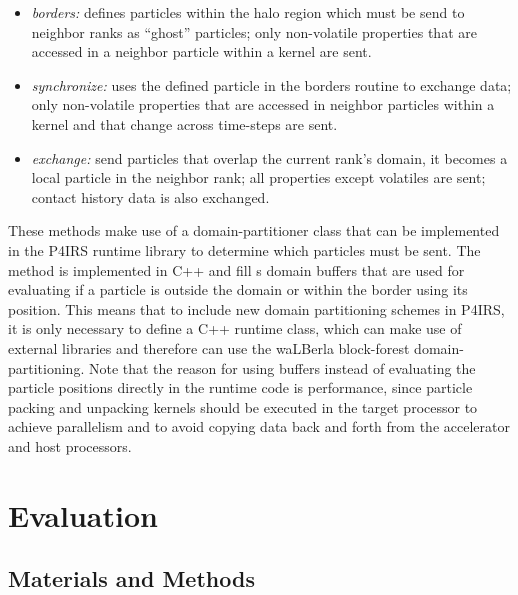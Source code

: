 \documentclass[Afour,sageh,times]{sagej}
\newcommand{\RMchange}[1]{{\color{blue} #1}}
\begin{document}
\begin{itemize}
    \item \emph{borders:} defines particles within the halo region which must be send to neighbor ranks as ``ghost'' particles; only non-volatile properties that are accessed in a neighbor particle within a kernel are sent.
    \item \emph{synchronize:} uses the defined particle in the borders routine to exchange data; only non-volatile properties that are accessed in neighbor particles within a kernel and that change across time-steps are sent.
    \item \emph{exchange:} send particles that overlap the current rank's domain, it becomes a local particle in the neighbor rank; all properties except volatiles are sent; contact history data is also exchanged.
\end{itemize}

These methods make use of a domain-partitioner class that can be implemented in the P4IRS runtime \RMchange{library} to determine which particles must be sent.
The method is implemented in C++ and fill\RMchange{s} domain buffers that are used for evaluating if a particle is outside the domain or within the border using its position.
This means that to include new domain partitioning schemes in P4IRS, it is only necessary to define a C++ runtime class, which can make use of external libraries and therefore can use the waLBerla block-forest domain-partitioning.
Note that the reason for using buffers instead of evaluating the particle positions directly in the runtime code is performance, since particle packing and unpacking kernels should be executed in the target processor to achieve parallelism and to avoid copying data back and forth from the accelerator and host processors.

\section{Evaluation}
\label{sec:evaluation}


\subsection{Materials and Methods}
\end{document}
